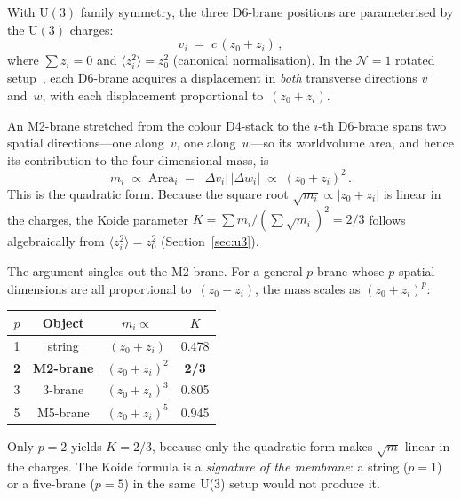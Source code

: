 \documentclass[12pt,a4paper]{article}
\begin{document}
With $\mathrm{U}(3)$ family symmetry, the three D6-brane positions
are parameterised by the $\mathrm{U}(3)$ charges:
\begin{equation}
  v_i \;=\; c\,(z_0 + z_i)\,,
  \label{eq:D6positions}
\end{equation}
where $\sum z_i = 0$ and $\langle z_i^2 \rangle = z_0^2$
(canonical normalisation).  In the $\mathcal{N}=1$ rotated
setup~\cite{HoriOoguriOz:1997}, each D6-brane acquires a
displacement in \emph{both} transverse directions $v$ and~$w$,
with each displacement proportional to~$(z_0 + z_i)$.

An M2-brane stretched from the colour D4-stack to the $i$-th
D6-brane spans two spatial directions---one along~$v$, one
along~$w$---so its worldvolume area, and hence its contribution to
the four-dimensional mass, is
\begin{equation}
  m_i \;\propto\; \mathrm{Area}_i
      \;=\; |\Delta v_i|\,|\Delta w_i|
      \;\propto\; (z_0 + z_i)^2\,.
  \label{eq:M2area}
\end{equation}
This is the quadratic form.  Because the square root
$\sqrt{m_i} \propto |z_0 + z_i|$ is linear in the charges, the
Koide parameter $K = \sum m_i / (\sum\sqrt{m_i})^2 = 2/3$ follows
algebraically from $\langle z_i^2 \rangle = z_0^2$
(Section~\ref{sec:u3}).

The argument singles out the M2-brane.  For a general $p$-brane
whose $p$ spatial dimensions are all proportional to~$(z_0 + z_i)$,
the mass scales as $(z_0 + z_i)^p$:
\begin{center}
\begin{tabular}{cccc}
\toprule
$p$ & Object & $m_i \propto$ & $K$ \\
\midrule
1 & string & $(z_0{+}z_i)$ & 0.478 \\
\textbf{2} & \textbf{M2-brane} & $(z_0{+}z_i)^2$ & \textbf{2/3} \\
3 & 3-brane & $(z_0{+}z_i)^3$ & 0.805 \\
5 & M5-brane & $(z_0{+}z_i)^5$ & 0.945 \\
\bottomrule
\end{tabular}
\end{center}
Only $p = 2$ yields $K = 2/3$, because only the quadratic form
makes $\sqrt{m}$ linear in the charges.  The Koide formula is a
\emph{signature of the membrane}: a string ($p=1$) or a five-brane
($p=5$) in the same U(3) setup would not produce it.
\end{document}
